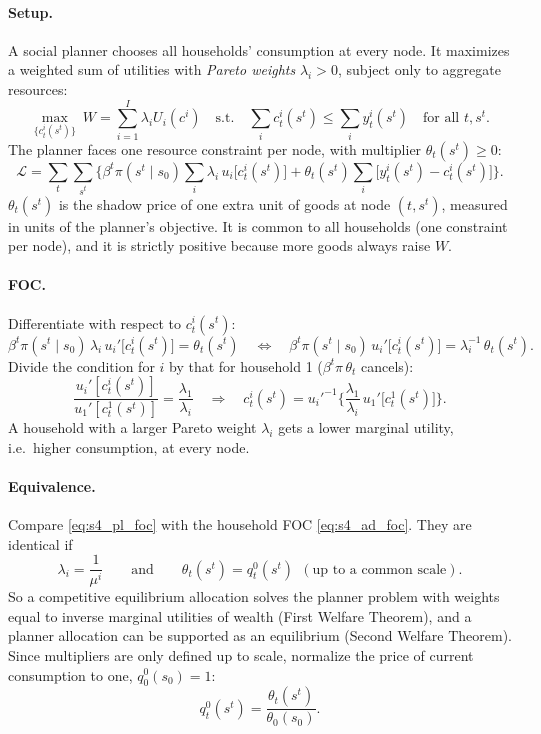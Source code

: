 \paragraph{Setup.} A social planner chooses all households' consumption at every node. It maximizes a weighted sum of utilities with \emph{Pareto weights} $\lambda_i>0$, subject only to aggregate resources:
\[
  \max_{\{c^i_t(s^t)\}}\ W=\sum_{i=1}^I\lambda_i U_i(c^i)
  \quad\text{s.t.}\quad \sum_i c^i_t(s^t)\le\sum_i y^i_t(s^t)\quad \text{for all } t,s^t.
\]
The planner faces one resource constraint per node, with multiplier $\theta_t(s^t)\ge0$:
\[
\mathcal L = \sum_{t}\sum_{s^t}\Big\{\beta^t\pi(s^t\mid s_0)\sum_i\lambda_i\, u_i\big[c^i_t(s^t)\big]
 + \theta_t(s^t)\sum_i\big[y^i_t(s^t)-c^i_t(s^t)\big]\Big\}.
\]
$\theta_t(s^t)$ is the shadow price of one extra unit of goods at node $(t,s^t)$, measured in units of the planner's objective. It is common to all households (one constraint per node), and it is strictly positive because more goods always raise $W$.

\paragraph{FOC.} Differentiate with respect to $c^i_t(s^t)$:
\begin{equation}\label{eq:s4_pl_foc}
  \beta^t\pi(s^t\mid s_0)\,\lambda_i\,u_i'\big[c^i_t(s^t)\big] = \theta_t(s^t)
  \quad\Longleftrightarrow\quad
  \beta^t\pi(s^t\mid s_0)\,u_i'\big[c^i_t(s^t)\big] = \lambda_i^{-1}\,\theta_t(s^t).
\end{equation}
Divide the condition for $i$ by that for household 1 ($\beta^t\pi\,\theta_t$ cancels):
\begin{equation}\label{eq:s4_pl_ratio}
  \frac{u_i'[c^i_t(s^t)]}{u_1'[c^1_t(s^t)]} = \frac{\lambda_1}{\lambda_i}
  \quad\Longrightarrow\quad
  c^i_t(s^t)=u_i'^{-1}\Big\{\frac{\lambda_1}{\lambda_i}\,u_1'\big[c^1_t(s^t)\big]\Big\}.
\end{equation}
A household with a larger Pareto weight $\lambda_i$ gets a lower marginal utility, i.e.\ higher consumption, at every node.

\paragraph{Equivalence.} Compare \eqref{eq:s4_pl_foc} with the household FOC \eqref{eq:s4_ad_foc}. They are identical if
\[
  \lambda_i = \frac{1}{\mu^i}\qquad\text{and}\qquad \theta_t(s^t) = q^0_t(s^t)\ \ (\text{up to a common scale}).
\]
So a competitive equilibrium allocation solves the planner problem with weights equal to inverse marginal utilities of wealth (First Welfare Theorem), and a planner allocation can be supported as an equilibrium (Second Welfare Theorem). Since multipliers are only defined up to scale, normalize the price of current consumption to one, $q^0_0(s_0)=1$:
\[
  q^0_t(s^t) = \frac{\theta_t(s^t)}{\theta_0(s_0)}.
\]

